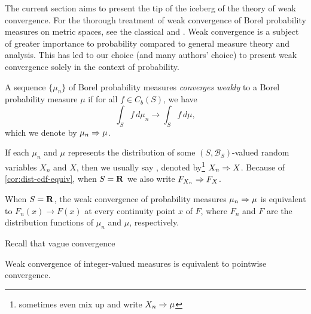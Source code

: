 The current section aims to present the tip of the iceberg of the theory of weak convergence. For the thorough treatment of weak convergence of Borel probability measures on metric spaces, see the classical \cite{Billingsley_1999} and \cite{Parthasarathy_1967}. Weak convergence is a subject of greater importance to probability compared to general measure theory and analysis. This has led to our choice (and many authors' choice) to present weak convergence solely in the context of probability. %

\begin{defn}
    A sequence $\{\mu_n\}$ of Borel probability measures \emph{converges weakly} to a Borel probability measure $\mu$ if for all $f\in C_b(S)$, we have \[
        \int_S f\,d\mu_n \to \int_S f\,d\mu, 
    \]
    which we denote by $\mu_n \Rightarrow \mu$.

    If each $\mu_n$ and $\mu$ represents the distribution of some $(S,\mathcal B_S)$-valued random variables $X_n$ and $X$, then we usually say , denoted by\footnote{sometimes even mix up and write $X_n \Rightarrow \mu$} $X_n \Rightarrow X$. Because of \cref{cor:dist-cdf-equiv}, when $S = \mathbf{R}$ we also write $F_{X_n} \Rightarrow F_{X}$.
\end{defn}

\begin{thm}
    When $S = \mathbf{R}$, the weak convergence of probability measures $\mu_n \Rightarrow \mu$ is equivalent to $F_n(x) \to F(x)$ at every continuity point $x$ of $F$, where $F_n$ and $F$ are the distribution functions of $\mu_n$ and $\mu$, respectively.
\end{thm}

Recall that vague convergence

\begin{prop}
    Weak convergence of integer-valued measures is equivalent to pointwise convergence.
\end{prop}

